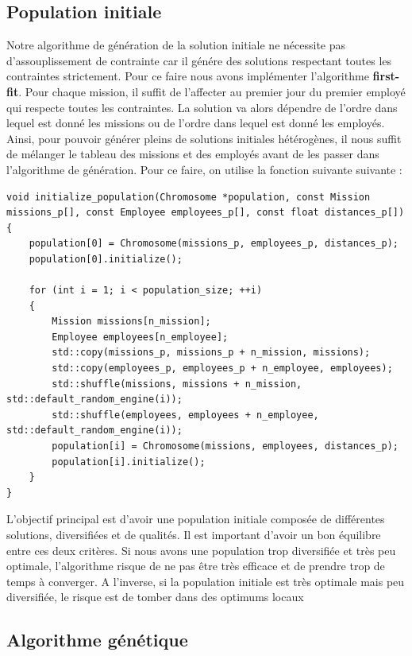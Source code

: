 \documentclass{article}
\begin{document}
    \subsection{Population initiale}
    Notre algorithme de génération de la solution initiale ne nécessite pas d'assouplissement de contrainte car il génére des solutions respectant toutes les contraintes strictement. Pour ce faire nous avons implémenter l'algorithme \textbf{first-fit}. Pour chaque mission, il suffit de l'affecter au premier jour du premier employé qui respecte toutes les contraintes. La solution va alors dépendre de l'ordre dans lequel est donné les missions ou de l'ordre dans lequel est donné les employés. Ainsi, pour pouvoir générer pleins de solutions initiales hétérogènes, il nous suffit de mélanger le tableau des missions et des employés avant de les passer dans l'algorithme de génération. Pour ce faire, on utilise la fonction suivante suivante :
\begin{lstlisting}
void initialize_population(Chromosome *population, const Mission missions_p[], const Employee employees_p[], const float distances_p[])
{
    population[0] = Chromosome(missions_p, employees_p, distances_p);
    population[0].initialize();

    for (int i = 1; i < population_size; ++i)
    {
        Mission missions[n_mission];
        Employee employees[n_employee];
        std::copy(missions_p, missions_p + n_mission, missions);
        std::copy(employees_p, employees_p + n_employee, employees);
        std::shuffle(missions, missions + n_mission, std::default_random_engine(i));
        std::shuffle(employees, employees + n_employee, std::default_random_engine(i));
        population[i] = Chromosome(missions, employees, distances_p);
        population[i].initialize();
    }
}
\end{lstlisting}
    L'objectif principal est d'avoir une population initiale composée de différentes solutions, diversifiées et de qualités. Il est important d'avoir un bon équilibre entre ces deux critères. Si nous avons une population trop diversifiée et très peu optimale, l'algorithme risque de ne pas être très efficace et de prendre trop de temps à converger. A l'inverse, si la population initiale est très optimale mais peu diversifiée, le risque est de tomber dans des optimums locaux
    \newline
    \newpage
    \subsection{Algorithme génétique}
\end{document}
